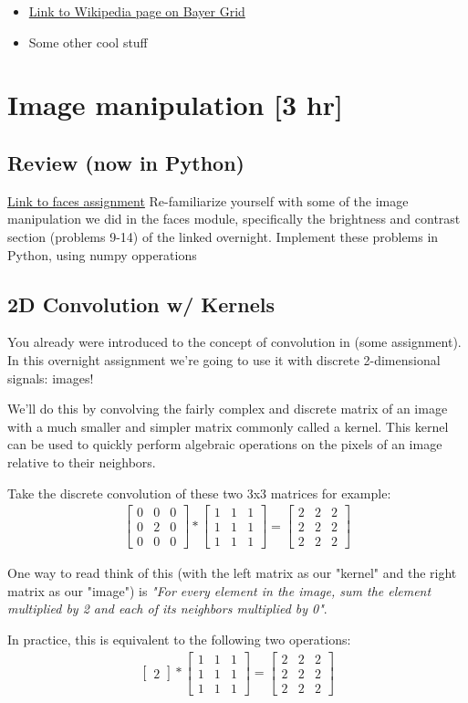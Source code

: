 \documentclass{tufte-handout}
\newcommand{\threebythree}[9]{\ensuremath{\begin{bmatrix} #1 & #2 & #3 \\ #4 & #5 & #6 \\ #7 & #8 & #9 \end{bmatrix}}}
\begin{document}
\begin{itemize}
\item \href{https://en.wikipedia.org/wiki/Bayer_filter
}{Link to Wikipedia page on Bayer Grid} 
\item Some other cool stuff
\end{itemize}

\section{Image manipulation [3 hr]}

\subsection{Review (now in Python)}
\href{https://drive.google.com/file/d/0B7LNBbaxYFujOHpEU2FDdkF6VEE/view 
}{Link to faces assignment}
Re-familiarize yourself with some of the image manipulation we did in the faces module, specifically the brightness and contrast section (problems 9-14) of the linked overnight. Implement these problems in Python, using numpy opperations

\subsection{2D Convolution w/ Kernels}  %

You already were introduced to the concept of convolution in (some assignment). In this overnight assignment we're going to use it with discrete 2-dimensional signals: images!

We'll do this by convolving the fairly complex and discrete matrix of an image with a much smaller and simpler matrix commonly called a kernel. This kernel can be used to quickly perform algebraic operations on the pixels of an image relative to their neighbors.

Take the discrete convolution of these two 3x3 matrices for example:
\begin{align}
    \threebythree{0}{0}{0}{0}{2}{0}{0}{0}{0} * \threebythree{1}{1}{1}{1}{1}{1}{1}{1}{1} = 
    \threebythree{2}{2}{2}{2}{2}{2}{2}{2}{2}
\end{align}

One way to read think of this (with the left matrix as our "kernel" and the right matrix as our "image") is \emph{"For every element in the image, sum the element multiplied by 2 and each of its neighbors multiplied by 0"}.

In practice, this is equivalent to the following two operations:
\begin{align}\label{eqn:convolution1}
    \begin{bmatrix}2\end{bmatrix} * \threebythree{1}{1}{1}{1}{1}{1}{1}{1}{1} = 
    \threebythree{2}{2}{2}{2}{2}{2}{2}{2}{2}
\end{align}
\end{document}
